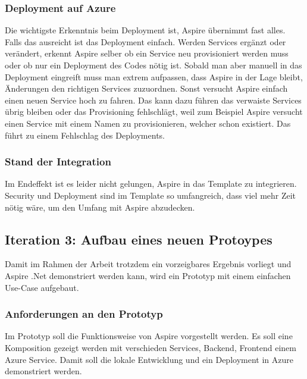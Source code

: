         \subsubsection{Deployment auf Azure}
            Die wichtigste Erkenntnis beim Deployment ist, Aspire übernimmt fast alles. Falls das ausreicht ist das Deployment einfach. Werden Services ergänzt oder verändert, erkennt Aspire selber ob ein Service neu provisioniert werden muss oder ob nur ein Deployment des Codes nötig ist. Sobald man aber manuell in das Deployment eingreift muss man extrem aufpassen, dass Aspire in der Lage bleibt, Änderungen den richtigen Services zuzuordnen. Sonst versucht Aspire einfach einen neuen Service hoch zu fahren. Das kann dazu führen das verwaiste Services übrig bleiben oder das Provisioning fehlschlägt, weil zum Beispiel Aspire versucht einen Service mit einem Namen zu provisionieren, welcher schon existiert. Das führt zu einem Fehlschlag des Deployments.

        \subsubsection{Stand der Integration}
            Im Endeffekt ist es leider nicht gelungen, Aspire in das Template zu integrieren. Security und Deployment sind im Template so umfangreich, dass viel mehr Zeit nötig wäre, um den Umfang mit Aspire abzudecken.

    \subsection{Iteration 3: Aufbau eines neuen Protoypes}
        Damit im Rahmen der Arbeit trotzdem ein vorzeigbares Ergebnis vorliegt und Aspire .Net demonstriert werden kann, wird ein Prototyp mit einem einfachen Use-Case aufgebaut.
        
        \subsubsection{Anforderungen an den Prototyp}
            Im Prototyp soll die Funktionsweise von Aspire vorgestellt werden. Es soll eine Komposition gezeigt werden mit verschieden Services, Backend, Frontend einem Azure Service. Damit soll die lokale Entwicklung und ein Deployment in Azure demonstriert werden.
    

